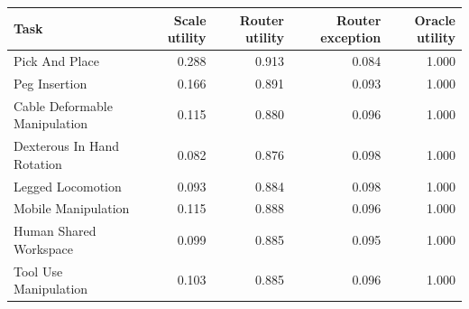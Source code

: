 \begin{tabular}{lrrrr}
\toprule
Task & Scale utility & Router utility & Router exception & Oracle utility \\
\midrule
Pick And Place & 0.288 & 0.913 & 0.084 & 1.000 \\
Peg Insertion & 0.166 & 0.891 & 0.093 & 1.000 \\
Cable Deformable Manipulation & 0.115 & 0.880 & 0.096 & 1.000 \\
Dexterous In Hand Rotation & 0.082 & 0.876 & 0.098 & 1.000 \\
Legged Locomotion & 0.093 & 0.884 & 0.098 & 1.000 \\
Mobile Manipulation & 0.115 & 0.888 & 0.096 & 1.000 \\
Human Shared Workspace & 0.099 & 0.885 & 0.095 & 1.000 \\
Tool Use Manipulation & 0.103 & 0.885 & 0.096 & 1.000 \\
\bottomrule
\end{tabular}
